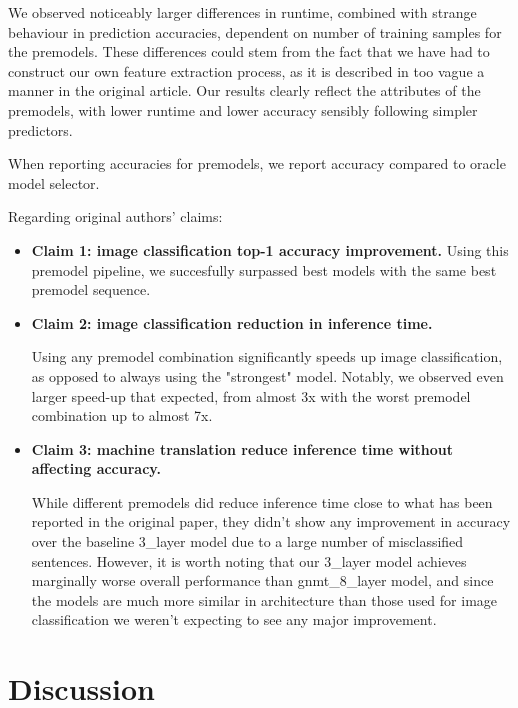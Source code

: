 We observed noticeably larger differences in runtime, combined with strange behaviour in prediction accuracies, dependent on number of training samples for the premodels. These differences could stem from the fact that we have had to construct our own feature extraction process, as it is described in too vague a manner in the original article. Our results clearly reflect the attributes of the premodels, with lower runtime and lower accuracy sensibly following simpler predictors.

When reporting accuracies for premodels, we report accuracy compared to oracle model selector.

Regarding original authors' claims:
\begin{itemize}
	\item \textbf{Claim 1: image classification top-1 accuracy improvement.}
	      Using this premodel pipeline, we succesfully surpassed best models with the same best premodel sequence.
	      
	\item \textbf{Claim 2: image classification reduction in inference time.}
	      
	      Using any premodel combination significantly speeds up image classification, as opposed to always using the "strongest" model. Notably, we observed even larger speed-up that expected, from almost 3x with the worst premodel combination up to almost 7x.
	      
	\item \textbf{Claim 3: machine translation reduce inference time without affecting accuracy.}
	      
	      While different premodels did reduce inference time close to what has been reported in the original paper, they didn't show any improvement in accuracy over the baseline 3\_layer model due to a large number of misclassified sentences. However, it is worth noting that our 3\_layer model achieves marginally worse overall performance than gnmt\_8\_layer model, and since the models are much more similar in architecture than those used for image classification we weren't expecting to see any major improvement.
	      
\end{itemize}



\section{Discussion}

